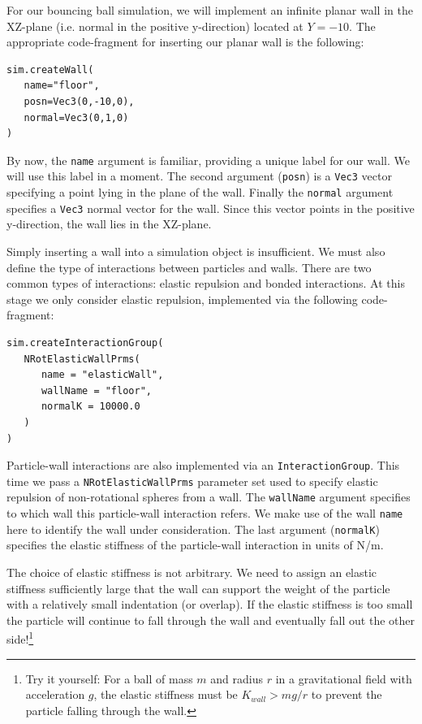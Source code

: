 For our bouncing ball simulation, we will implement an infinite planar wall in the XZ-plane (i.e. normal in the positive y-direction) located at $Y=-10$. The appropriate code-fragment for inserting our planar wall is the following:

\begin{verbatim}
sim.createWall(
   name="floor",
   posn=Vec3(0,-10,0),
   normal=Vec3(0,1,0)
)
\end{verbatim}

\noindent
By now, the \texttt{name} argument is familiar, providing a unique label for our wall. We will use this label in a moment. The second argument (\texttt{posn}) is a \texttt{Vec3} vector specifying a point lying in the plane of the wall. Finally the \texttt{normal} argument specifies a \texttt{Vec3} normal vector for the wall. Since this vector points in the positive y-direction, the wall lies in the XZ-plane.

Simply inserting a wall into a simulation object is insufficient. We must also define the type of interactions between particles and walls. There are two common types of interactions: elastic repulsion and bonded interactions. At this stage we only consider elastic repulsion, implemented via the following code-fragment:

\begin{verbatim}
sim.createInteractionGroup(
   NRotElasticWallPrms(
      name = "elasticWall",
      wallName = "floor",
      normalK = 10000.0
   )
)
\end{verbatim}

\noindent
Particle-wall interactions are also implemented via an \texttt{InteractionGroup}. This time we pass a \texttt{NRotElasticWallPrms} parameter set used to specify elastic repulsion of non-rotational spheres from a wall. The \texttt{wallName} argument specifies to which wall this particle-wall interaction refers. We make use of the wall \texttt{name} here to identify the wall under consideration. The last argument (\texttt{normalK}) specifies the elastic stiffness of the particle-wall interaction in units of N/m.

The choice of elastic stiffness is not arbitrary. We need to assign an elastic stiffness sufficiently large that the wall can support the weight of the particle with a relatively small indentation (or overlap). If the elastic stiffness is too small the particle will continue to fall through the wall and eventually fall out the other side!\footnote{Try it yourself: For a ball of mass $m$ and radius $r$ in a gravitational field with acceleration $g$, the elastic stiffness must be $K_{wall} > mg/r$ to prevent the particle falling through the wall.}


